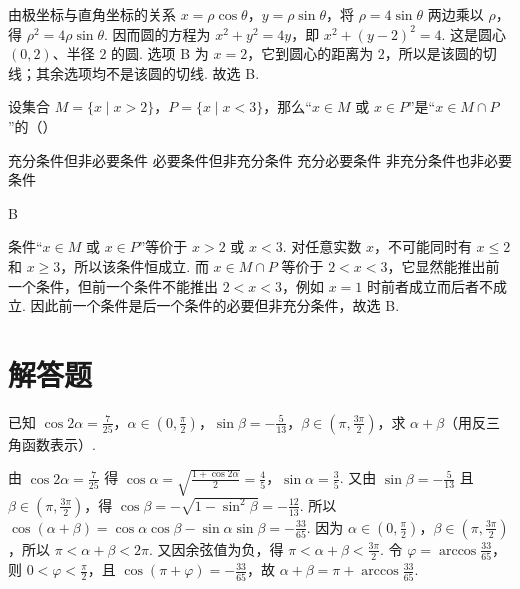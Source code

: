 \begin{solution}
由极坐标与直角坐标的关系 \(x=\rho\cos\theta\)，\(y=\rho\sin\theta\)，将 \(\rho=4\sin\theta\) 两边乘以 \(\rho\)，得 \(\rho^2=4\rho\sin\theta\). 因而圆的方程为 \(x^2+y^2=4y\)，即 \(x^2+(y-2)^2=4\). 这是圆心 \((0,2)\)、半径 \(2\) 的圆. 选项 B 为 \(x=2\)，它到圆心的距离为 \(2\)，所以是该圆的切线；其余选项均不是该圆的切线. 故选 B.
\end{solution}

\begin{problem}
设集合 \(M = \{x \mid x > 2\}\)，\(P = \{x \mid x < 3\}\)，那么“\(x \in M\) 或 \(x \in P\)”是“\(x \in M \cap P\)”的（\quad）

\choices
    {充分条件但非必要条件}
    {必要条件但非充分条件}
    {充分必要条件}
    {非充分条件也非必要条件}
\end{problem}

\begin{answer}
B
\end{answer}

\begin{solution}
条件“\(x\in M\) 或 \(x\in P\)”等价于 \(x>2\) 或 \(x<3\). 对任意实数 \(x\)，不可能同时有 \(x\leqslant2\) 和 \(x\geqslant3\)，所以该条件恒成立. 而 \(x\in M\cap P\) 等价于 \(2<x<3\)，它显然能推出前一个条件，但前一个条件不能推出 \(2<x<3\)，例如 \(x=1\) 时前者成立而后者不成立. 因此前一个条件是后一个条件的必要但非充分条件，故选 B.
\end{solution}

\section{解答题}

\begin{problem}
已知 \(\cos 2\alpha = \frac{7}{25}\)，\(\alpha \in \left(0, \frac{\pi}{2}\right)\)，\(\sin \beta = -\frac{5}{13}\)，\(\beta \in \left(\pi, \frac{3\pi}{2}\right)\)，求 \(\alpha + \beta\)（用反三角函数表示）.
\end{problem}

\begin{solution}
由 \(\cos 2\alpha = \frac{7}{25}\) 得 \(\cos \alpha = \sqrt{\frac{1 + \cos 2\alpha}{2}} = \frac{4}{5}\)，\(\sin \alpha = \frac{3}{5}\). 又由 \(\sin \beta = -\frac{5}{13}\) 且 \(\beta \in \left(\pi,\frac{3\pi}{2}\right)\)，得 \(\cos \beta = -\sqrt{1 - \sin^2 \beta} = -\frac{12}{13}\). 所以 \(\cos(\alpha + \beta) = \cos \alpha \cos \beta - \sin \alpha \sin \beta = -\frac{33}{65}\). 因为 \(\alpha\in\left(0,\frac{\pi}{2}\right)\)，\(\beta\in\left(\pi,\frac{3\pi}{2}\right)\)，所以 \(\pi<\alpha+\beta<2\pi\). 又因余弦值为负，得 \(\pi<\alpha+\beta<\frac{3\pi}{2}\). 令 \(\varphi=\arccos\frac{33}{65}\)，则 \(0<\varphi<\frac{\pi}{2}\)，且 \(\cos(\pi+\varphi)=-\frac{33}{65}\)，故 \(\alpha+\beta=\pi+\arccos\frac{33}{65}\).
\end{solution}

